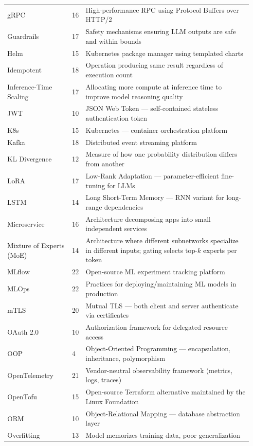\documentclass[11pt, a4paper, oneside]{report}
\begin{document}
{{{{{{{{{\begin{longtable}{L{0.22\textwidth} L{0.08\textwidth} L{0.60\textwidth}}
gRPC & 16 & High-performance RPC using Protocol Buffers over HTTP/2 \\
Guardrails & 17 & Safety mechanisms ensuring LLM outputs are safe and within bounds \\
Helm & 15 & Kubernetes package manager using templated charts \\
Idempotent & 18 & Operation producing same result regardless of execution count \\
Inference-Time Scaling & 17 & Allocating more compute at inference time to improve model reasoning quality \\
JWT & 10 & JSON Web Token --- self-contained stateless authentication token \\
K8s & 15 & Kubernetes --- container orchestration platform \\
Kafka & 18 & Distributed event streaming platform \\
KL Divergence & 12 & Measure of how one probability distribution differs from another \\
LoRA & 17 & Low-Rank Adaptation --- parameter-efficient fine-tuning for LLMs \\
LSTM & 14 & Long Short-Term Memory --- RNN variant for long-range dependencies \\
Microservice & 16 & Architecture decomposing apps into small independent services \\
Mixture of Experts (MoE) & 14 & Architecture where different subnetworks specialize in different inputs; gating selects top-$k$ experts per token \\
MLflow & 22 & Open-source ML experiment tracking platform \\
MLOps & 22 & Practices for deploying/maintaining ML models in production \\
mTLS & 20 & Mutual TLS --- both client and server authenticate via certificates \\
OAuth 2.0 & 10 & Authorization framework for delegated resource access \\
OOP & 4 & Object-Oriented Programming --- encapsulation, inheritance, polymorphism \\
OpenTelemetry & 21 & Vendor-neutral observability framework (metrics, logs, traces) \\
OpenTofu & 15 & Open-source Terraform alternative maintained by the Linux Foundation \\
ORM & 10 & Object-Relational Mapping --- database abstraction layer \\
Overfitting & 13 & Model memorizes training data, poor generalization \\

\end{longtable}}}}}}}}}}
\end{document}
